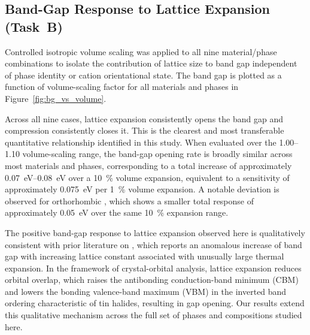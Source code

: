 \subsection{Band-Gap Response to Lattice Expansion (Task~B)}
\label{subsec:results_taskB_expansion}

Controlled isotropic volume scaling was applied to all nine
material/phase combinations to isolate the contribution of lattice
size to band gap independent of phase identity or cation orientational
state.
The band gap is plotted as a function of volume-scaling factor for
all materials and phases in Figure~\ref{fig:bg_vs_volume}.

Across all nine cases, lattice expansion consistently opens the band
gap and compression consistently closes it.
This is the clearest and most transferable quantitative relationship
identified in this study.
When evaluated over the \numrange{1.00}{1.10} volume-scaling range,
the band-gap opening rate is broadly similar across most materials
and phases, corresponding to a total increase of approximately
\SIrange{0.07}{0.08}{eV} over a \SI{10}{\percent} volume expansion,
equivalent to a sensitivity of approximately
\SI{0.075}{eV} per \SI{1}{\percent} volume expansion.
A notable deviation is observed for orthorhombic \MASnI{}, which
shows a smaller total response of approximately \SI{0.05}{eV} over
the same \SI{10}{\percent} expansion range.

The positive band-gap response to lattice expansion observed here is
qualitatively consistent with prior literature on \CsSnI{}, which
reports an anomalous increase of band gap with increasing lattice
constant associated with unusually large thermal
expansion.\cite{monacelli2023thermodynamics}
In the framework of crystal-orbital analysis, lattice expansion
reduces  orbital overlap, which raises the antibonding
conduction-band minimum (CBM) and lowers the bonding valence-band
maximum (VBM) in the inverted band ordering characteristic of tin
halides, resulting in gap opening.\cite{huang2013electronic}
Our results extend this qualitative mechanism across the full set of
phases and compositions studied here.


